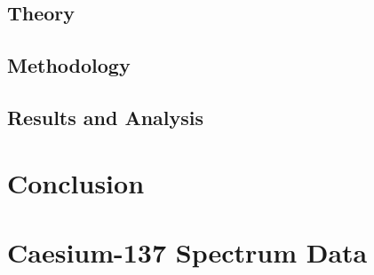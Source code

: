 \documentclass[%
reprint,
amsmath,amssymb,
aps,
]{revtex4-2}
\begin{document}
		\subsection{Theory}
			
		
		\subsection{Methodology}
		
		\subsection{Results and Analysis}


	\section{Conclusion}

		
		
	\clearpage
	
	\clearpage
	\onecolumngrid
	\appendix
	\section{Caesium-137 Spectrum Data}
	
\end{document}

